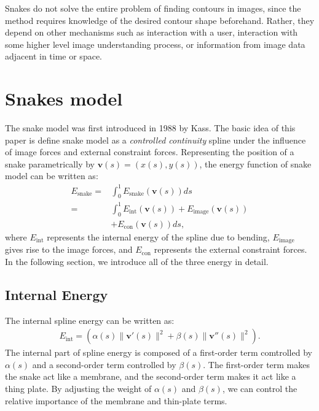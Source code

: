 \documentclass[journal]{IEEEtran}
\begin{document}
Snakes do not solve the entire problem of finding contours in images, since the method requires knowledge of the desired contour shape beforehand. Rather, they depend on other mechanisms such as interaction with a user, interaction with some higher level image understanding process, or information from image data adjacent in time or space.

\section{Snakes model}
The snake model was first introduced in 1988 by Kass\cite{snake}. The basic idea of this paper is define snake model as a \textit{controlled continuity}\cite{s18} spline under the influence of image forces and external constraint forces. Representing the position of a snake parametrically by $\mathbf{v}(s)=(x(s),y(s))$, the energy function of snake model can be written as:
\begin{equation}\begin{aligned}
E_{\text{snake}}=&\int_0^1 E_{\text{snake}}(\mathbf{v}(s))ds\\
=&\int_0^1 E_{\text{int}}(\mathbf{v}(s))+E_{\text{image}}(\mathbf{v}(s))\\
&+E_{\text{con}}(\mathbf{v}(s))ds,\label{eq1}
\end{aligned}\end{equation}
where $E_{\text{int}}$ represents the internal energy of the spline due to bending, $E_{\text{image}}$ gives rise to the image forces, and $E_{\text{con}}$ represents the external constraint forces. In the following section, we introduce all of the three energy in detail.
\subsection{Internal Energy}
The internal spline energy can be written as:
\begin{equation}\begin{aligned}
E_{\text{int}}=(\alpha(s)\|\mathbf{v}'(s)\|^2+\beta(s)\|\mathbf{v}''(s)\|^2).
\end{aligned}\end{equation}
The internal part of spline energy is composed of a first-order term comtrolled by $\alpha(s)$ and a second-order term controlled by $\beta(s)$. The first-order term makes the snake act like a membrane, and the second-order term makes it act like a thing plate. By adjusting the weight of $\alpha(s)$ and $\beta(s)$, we can control the relative importance of the membrane and thin-plate terms.
\end{document}
